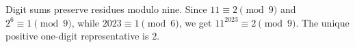 Digit sums preserve residues modulo nine. Since $11\equiv2\pmod9$ and $2^6\equiv1\pmod9$, while $2023\equiv1\pmod6$, we get $11^{2023}\equiv2\pmod9$. The unique positive one-digit representative is $\boxed2$.
